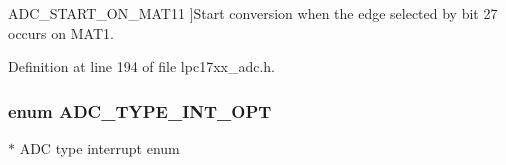 \begin{Desc}
\begin{description}
{\hypertarget{group___a_d_c___public___types_ggac6226b9af610bd4800b65ddfc93ee516a60213c70c0b3fd40c98ffa6aa2106391}{\-A\-D\-C\-\_\-\-S\-T\-A\-R\-T\-\_\-\-O\-N\-\_\-\-M\-A\-T11}\label{group___a_d_c___public___types_ggac6226b9af610bd4800b65ddfc93ee516a60213c70c0b3fd40c98ffa6aa2106391}
}]\-Start conversion when the edge selected by bit 27 occurs on \-M\-A\-T1. \end{description}
\end{Desc}



\-Definition at line 194 of file lpc17xx\-\_\-adc.\-h.

\hypertarget{group___a_d_c___public___types_gae7fc3523a8faf7363895609c07aba95b}{
\subsubsection[{\-A\-D\-C\-\_\-\-T\-Y\-P\-E\-\_\-\-I\-N\-T\-\_\-\-O\-P\-T}]{\setlength{\rightskip}{0pt plus 5cm}enum {\bf \-A\-D\-C\-\_\-\-T\-Y\-P\-E\-\_\-\-I\-N\-T\-\_\-\-O\-P\-T}}}\label{group___a_d_c___public___types_gae7fc3523a8faf7363895609c07aba95b}


$\ast$ \-A\-D\-C type interrupt enum 

